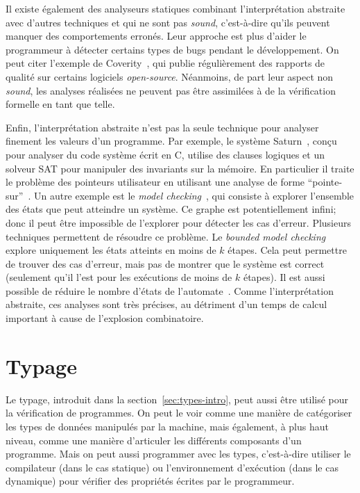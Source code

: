 Il existe également des analyseurs statiques combinant l'interprétation
abstraite avec d'autres techniques et qui ne sont pas \emph{sound}, c'est-à-dire
qu'ils peuvent manquer des comportements erronés. Leur approche est plus d'aider
le programmeur à détecter certains types de bugs pendant le développement. On
peut citer l'exemple de Coverity~\cite{coverityBillion}, qui publie
régulièrement des rapports de qualité sur certains logiciels \emph{open-source}.
Néanmoins, de part leur aspect non \emph{sound}, les analyses réalisées ne
peuvent pas être assimilées à de la vérification formelle en tant que telle.

Enfin, l'interprétation abstraite n'est pas la seule technique pour analyser
finement les valeurs d'un programme. Par exemple, le système
Saturn~\cite{paste07}, conçu pour analyser du code système écrit en C, utilise
des clauses logiques et un solveur SAT pour manipuler des invariants sur la
mémoire. En particulier il traite le problème des pointeurs utilisateur en
utilisant une analyse de forme \enquote{pointe-sur}~\cite{oakland08}. Un autre
exemple est le \emph{model checking}~\cite{modelcheck}, qui consiste à explorer
l'ensemble des états que peut atteindre un système. Ce graphe est
potentiellement infini; donc il peut être impossible de l'explorer pour détecter
les cas d'erreur. Plusieurs techniques permettent de résoudre ce problème. Le
\emph{bounded model checking}~\cite{boundedmodelchecking} explore uniquement les
états atteints en moins de $k$ étapes. Cela peut permettre de trouver des cas
d'erreur, mais pas de montrer que le système est correct (seulement qu'il l'est
pour les exécutions de moins de $k$ étapes). Il est aussi possible de réduire le
nombre d'états de l'automate~\cite{partitionmodelchecking}. Comme
l'interprétation abstraite, ces analyses sont très précises, au détriment d'un
temps de calcul important à cause de l'explosion combinatoire.

\section{Typage}

Le typage, introduit dans la section~\ref{sec:types-intro}, peut aussi être
utilisé pour la vérification de programmes. On peut le voir comme une manière de
catégoriser les types de données manipulés par la machine, mais également, à plus
haut niveau, comme une manière d'articuler les différents composants d'un
programme. Mais on peut aussi programmer avec les types, c'est-à-dire utiliser
le compilateur (dans le cas statique) ou l'environnement d'exécution (dans le
cas dynamique) pour vérifier des propriétés écrites par le programmeur.

